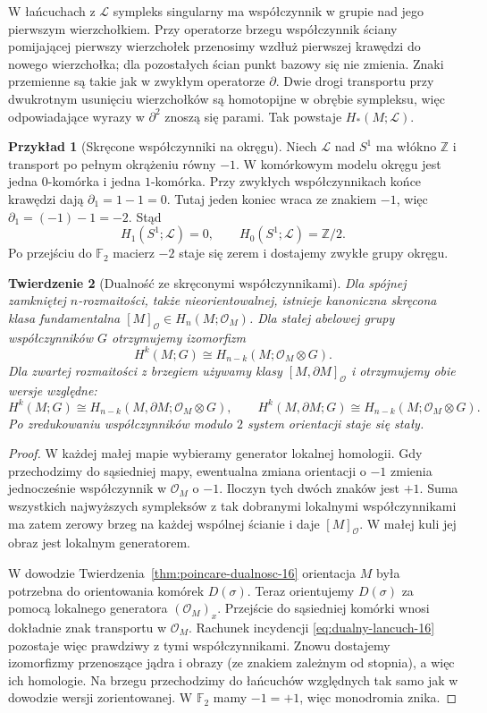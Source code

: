 \documentclass[11pt,a4paper,oneside]{report}
\newcommand{\Z}{\mathbb{Z}}
\theoremstyle{plain}
\newtheorem{twierdzenie}{Twierdzenie}[section]
\theoremstyle{definition}
\newtheorem{przyklad}[twierdzenie]{Przykład}
\theoremstyle{remark}
\begin{document}
W łańcuchach z $\mathcal L$
sympleks singularny ma
współczynnik w grupie
nad jego pierwszym
wierzchołkiem. Przy operatorze
brzegu współczynnik ściany
pomijającej pierwszy
wierzchołek przenosimy
wzdłuż pierwszej krawędzi
do nowego wierzchołka;
dla pozostałych ścian
punkt bazowy się nie
zmienia. Znaki przemienne
są takie jak w zwykłym
operatorze $\partial$.
Dwie drogi transportu
przy dwukrotnym usunięciu
wierzchołków są homotopijne
w obrębie sympleksu,
więc odpowiadające
wyrazy w $\partial^2$
znoszą się parami.
Tak powstaje
$H_*(M;\mathcal L)$.

\begin{przyklad}[Skręcone współczynniki na okręgu]
Niech $\mathcal L$ nad $S^1$
ma włókno $\Z$ i transport
po pełnym okrążeniu
równy $-1$. W komórkowym
modelu okręgu jest
jedna $0$-komórka
i jedna $1$-komórka.
Przy zwykłych
współczynnikach końce
krawędzi dają
$\partial_1=1-1=0$.
Tutaj jeden koniec
wraca ze znakiem
$-1$, więc
$\partial_1=(-1)-1=-2$.
Stąd
\[
 H_1(S^1;\mathcal L)=0,\qquad
 H_0(S^1;\mathcal L)=\Z/2.
\]
Po przejściu do
$\mathbb F_2$ macierz
$-2$ staje się zerem
i dostajemy zwykłe
grupy okręgu.
\end{przyklad}

\begin{twierdzenie}[Dualność ze skręconymi współczynnikami]
\label{thm:pd-skrecenie-16}
Dla spójnej zamkniętej
$n$-rozmaitości, także
nieorientowalnej, istnieje
kanoniczna skręcona klasa
fundamentalna
$[M]_{\mathcal O}\in
H_n(M;\mathcal O_M)$.
Dla stałej abelowej grupy
współczynników $G$
otrzymujemy izomorfizm
\[
 H^k(M;G)\cong
 H_{n-k}(M;\mathcal O_M\otimes G).
\]
Dla zwartej rozmaitości z brzegiem używamy
klasy $[M,\partial M]_{\mathcal O}$ i otrzymujemy
obie wersje względne:
\[
 H^k(M;G)\cong H_{n-k}(M,\partial M;\mathcal O_M\otimes G),
 \qquad
 H^k(M,\partial M;G)\cong H_{n-k}(M;\mathcal O_M\otimes G).
\]
Po zredukowaniu
współczynników modulo $2$
system orientacji staje
się stały.
\end{twierdzenie}
\begin{proof}
W każdej małej mapie
wybieramy generator
lokalnej homologii.
Gdy przechodzimy
do sąsiedniej mapy,
ewentualna zmiana
orientacji o $-1$
zmienia jednocześnie
współczynnik w
$\mathcal O_M$ o $-1$.
Iloczyn tych dwóch
znaków jest $+1$.
Suma wszystkich
najwyższych sympleksów
z tak dobranymi
lokalnymi współczynnikami
ma zatem zerowy brzeg
na każdej wspólnej
ścianie i daje
$[M]_{\mathcal O}$.
W małej kuli jej obraz
jest lokalnym generatorem.

W dowodzie
Twierdzenia~\ref{thm:poincare-dualnosc-16}
orientacja $M$ była
potrzebna do orientowania
komórek $D(\sigma)$.
Teraz orientujemy
$D(\sigma)$ za pomocą
lokalnego generatora
$(\mathcal O_M)_x$.
Przejście do sąsiedniej
komórki wnosi dokładnie
znak transportu
w $\mathcal O_M$.
Rachunek incydencji
\eqref{eq:dualny-lancuch-16}
pozostaje więc prawdziwy
z tymi współczynnikami.
Znowu dostajemy
izomorfizmy przenoszące jądra i obrazy
(ze znakiem zależnym od stopnia), a więc ich homologie.
Na brzegu przechodzimy
do łańcuchów względnych
tak samo jak w dowodzie
wersji zorientowanej.
W $\mathbb F_2$
mamy $-1=+1$,
więc monodromia znika.
\end{proof}
\end{document}

